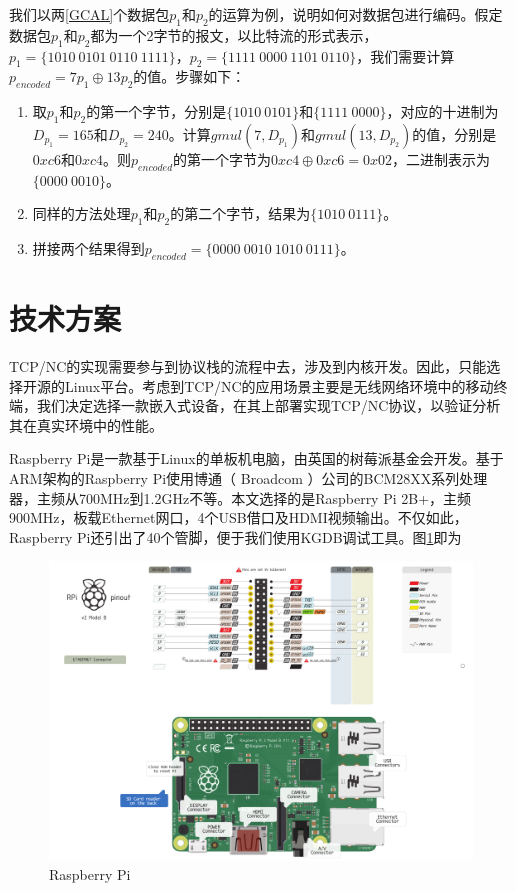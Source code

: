 \par
我们以两\ref{GCAL}个数据包$p_{1}$和$p_{2}$的运算为例，说明如何对数据包进行编码。假定数据包$p_{1}$和$p_{2}$都为一个2字节的报文，以比特流的形式表示，$p_{1}=\{1010\ 0101\ 0110\ 1111\}$，$p_{2}=\{1111\ 0000\ 1101\ 0110\}$，我们需要计算$p_{encoded}=7p_{1} \oplus 13p_{2}$的值。步骤如下：
\begin{enumerate}[fullwidth,itemindent=2em,label=(\arabic*)]
	\item 取$p_{1}$和$p_{2}$的第一个字节，分别是$\{1010\ 0101\}$和$\{1111\ 0000\}$，对应的十进制为$D_{p_1}=165$和$D_{p_2}=240$。计算$gmul\left(7,D_{p_1}\right)$和$gmul\left(13,D_{p_2}\right)$的值，分别是$0xc6$和$0xc4$。则$p_{encoded}$的第一个字节为$0xc4 \oplus 0xc6=0x02$，二进制表示为$\{0000\ 0010\}$。
	\item 同样的方法处理$p_{1}$和$p_{2}$的第二个字节，结果为$\{1010\ 0111\}$。
	\item 拼接两个结果得到$p_{encoded}=\{0000\ 0010\ 1010\ 0111\}$。
\end{enumerate}
\section{技术方案}
TCP/NC的实现需要参与到协议栈的流程中去，涉及到内核开发。因此，只能选择开源的Linux平台。考虑到TCP/NC的应用场景主要是无线网络环境中的移动终端，我们决定选择一款嵌入式设备，在其上部署实现TCP/NC协议，以验证分析其在真实环境中的性能。
\par
Raspberry Pi是一款基于Linux的单板机电脑，由英国的树莓派基金会开发。基于ARM架构的Raspberry Pi使用博通（ Broadcom ）公司的BCM28XX系列处理器，主频从700MHz到1.2GHz不等。本文选择的是Raspberry Pi 2B+，主频900MHz，板载Ethernet网口，4个USB借口及HDMI视频输出。不仅如此，Raspberry Pi还引出了40个管脚，便于我们使用KGDB调试工具。图\ref{RASP_EPS}即为
\begin{figure}
	\centering
\includegraphics[width=6in]{figures/rasp.pdf}
\caption{Raspberry Pi}
\label{RASP_EPS}
\end{figure}

